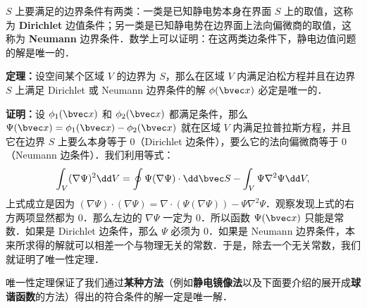 $S$ 上要满足的边界条件有两类：一类是已知静电势本身在界面 $S$
上的取值，这称为 \textbf{Dirichlet} 边值条件；另一类是已知静电势在边界面上法向偏微商的取值，这称为 \textbf{Neumann} 边界条件．数学上可以证明：在这两类边条件下，静电边值问题的解是唯一的．

\textbf{定理：}设空间某个区域 $V$ 的边界为 $S$，那么在区域 $V$ 内满足泊松方程并且在边界 $S$ 上满足 Dirichlet 或 Neumann 边界条件的解 $\phi(\bvec x)$ 必定是唯一的．

\textbf{证明：}设 $\phi_1(\bvec x)$ 和 $\phi_2(\bvec x)$ 都满足条件，那么 $\Psi(\bvec x)=\phi_1(\bvec x)-\phi_2(\bvec x)$ 就在区域 $V$ 内满足拉普拉斯方程，并且它在边界 $S$ 上要么本身等于 $0$（Dirichlet 边条件），要么它的法向偏微商等于 $0$（Neumann 边条件）．我们利用等式：
\begin{align}
\int_V (\nabla \Psi)^2 \dd V=\oint \Psi(\nabla \Psi)\cdot \dd \bvec S - \int_V \Psi \nabla^2\Psi \dd V,
\end{align}
上式成立是因为 $(\nabla \Psi)\cdot (\nabla \Psi)=\nabla\cdot (\Psi(\nabla\Psi))-\Psi\nabla^2\Psi$．观察发现上式的右方两项显然都为 $0$．那么左边的 $\nabla\Psi$ 一定为 $0$．所以函数 $\Psi(\bvec x)$ 只能是常数．如果是 Dirichlet 边条件，那么 $\Psi$ 必须为 $0$．如果是 Neumann 边界条件，本来所求得的解就可以相差一个与物理无关的常数．于是，除去一个无关常数，我们就证明了唯一性定理．

唯一性定理保证了我们通过\textbf{某种方法}（例如\textbf{静电镜像法}以及下面要介绍的展开成\textbf{球谐函数}的方法）得出的符合条件的解一定是唯一解．

